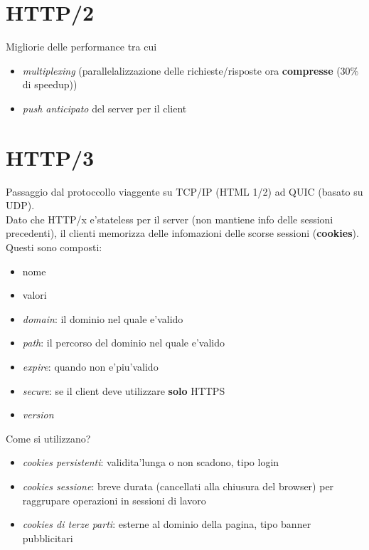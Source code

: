 \documentclass[a4paper,12pt]{article}
\begin{document}
\section{HTTP/2}
Migliorie delle performance tra cui
\begin{itemize}
    \item \textit{multiplexing} (parallelalizzazione delle richieste/risposte ora \textbf{compresse} (30\% di speedup))
    \item \textit{push anticipato} del server per il client
\end{itemize}
\section{HTTP/3}
Passaggio dal protoccollo viaggente su TCP/IP (HTML 1/2) ad QUIC (basato su UDP). \\
Dato che HTTP/x e'stateless per il server (non mantiene info delle sessioni precedenti), il clienti memorizza delle infomazioni delle scorse sessioni (\textbf{cookies}). Questi sono composti:
\begin{itemize}
    \item nome
    \item valori
    \item \textit{domain}: il dominio nel quale e'valido
    \item \textit{path}: il percorso del dominio nel quale e'valido
    \item \textit{expire}: quando non e'piu'valido
    \item \textit{secure}: se il client deve utilizzare \textbf{solo} HTTPS
    \item \textit{version}
\end{itemize}
Come si utilizzano?
\begin{itemize}
    \item \textit{cookies persistenti}: validita'lunga o non scadono, tipo login
    \item \textit{cookies sessione}: breve durata (cancellati alla chiusura del browser) per raggrupare operazioni in sessioni di lavoro
    \item \textit{cookies di terze parti}: esterne al dominio della pagina, tipo banner pubblicitari
\end{itemize}
\end{document}
